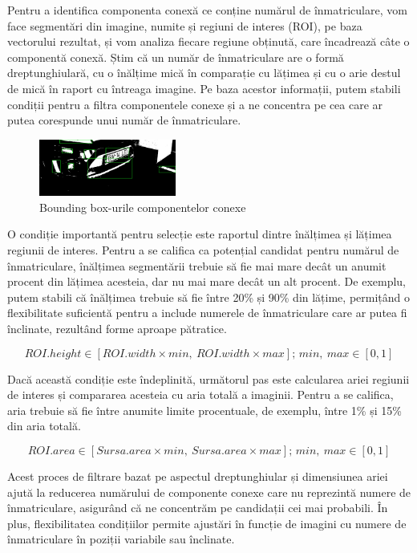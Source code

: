 \documentclass[a4paper,12pt]{report}
\begin{document}
Pentru a identifica componenta conexă ce conține numărul de înmatriculare, vom face segmentări din imagine, numite și regiuni de interes (ROI), pe baza vectorului rezultat, și vom analiza fiecare regiune obținută, care încadrează câte o componentă conexă. Știm că un număr de înmatriculare are o formă dreptunghiulară, cu o înălțime mică în comparație cu lățimea și cu o arie destul de mică în raport cu întreaga imagine. Pe baza acestor informații, putem stabili condiții pentru a filtra componentele conexe și a ne concentra pe cea care ar putea corespunde unui număr de înmatriculare.

\begin{figure}[h!]
    \centering
    \includegraphics[width=0.4\textwidth]{images/bboxes.jpg}
    \caption{Bounding box-urile componentelor conexe}
\end{figure}
\FloatBarrier

O condiție importantă pentru selecție este raportul dintre înălțimea și lățimea regiunii de interes. Pentru a se califica ca potențial candidat pentru numărul de înmatriculare, înălțimea segmentării trebuie să fie mai mare decât un anumit procent din lățimea acesteia, dar nu mai mare decât un alt procent. De exemplu, putem stabili că înălțimea trebuie să fie între 20\% și 90\% din lățime, permițând o flexibilitate suficientă pentru a include numerele de înmatriculare care ar putea fi înclinate, rezultând forme aproape pătratice.

\[
    ROI.height \in [ROI.width \times min, \ ROI.width \times max]; \, min, \ max \in [0, 1]
\]

Dacă această condiție este îndeplinită, următorul pas este calcularea ariei regiunii de interes și compararea acesteia cu aria totală a imaginii. Pentru a se califica, aria trebuie să fie între anumite limite procentuale, de exemplu, între 1\% și 15\% din aria totală.

\[
    ROI.area \in [Sursa.area \times min, \ Sursa.area \times max]; \, min, \ max \in [0, 1]
\]

Acest proces de filtrare bazat pe aspectul dreptunghiular și dimensiunea ariei ajută la reducerea numărului de componente conexe care nu reprezintă numere de înmatriculare, asigurând că ne concentrăm pe candidații cei mai probabili. În plus, flexibilitatea condițiilor permite ajustări în funcție de imagini cu numere de înmatriculare în poziții variabile sau înclinate.
\end{document}
